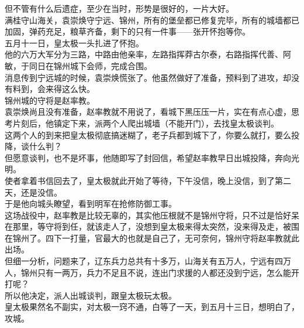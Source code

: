 \begin{multicols}{\theparacolNo}
但不管有什么后遗症，至少在当时，形势是很好的，一片大好。\\

满桂守山海关，袁崇焕守宁远、锦州，所有的堡垒都已修复完毕，所有的城墙都已加固，弹药充足，粮草齐备，剩下的只有一件事——张开怀抱等你。\\

五月十一日，皇太极一头扎进了怀抱。\\

他的六万大军分为三路，中路由他亲率，左路指挥莽古尔泰，右路指挥代善、阿敏，于同日在锦州城下会师，完成合围。\\

消息传到宁远城的时候，袁崇焕慌张了。他虽然做好了准备，预料到了进攻，却没有料到，会来得这么快。\\

锦州城的守将是赵率教。\\

袁崇焕尚且没有准备，赵率教就不用说了，看城下黑压压一片，实在有点心虚，思考片刻后，他镇定下来，派两个人爬出城墙（不能开门），去找皇太极谈判。\\

这两个人的到来把皇太极彻底搞迷糊了，老子兵都到城下了，你要么就打，要么投降，谈什么判？\\

但愿意谈判，也不是坏事，他随即写了封回信，希望赵率教早日出城投降，奔向光明。\\

使者拿着书信回去了，皇太极就此开始了等待，下午没信，晚上没信，到了第二天，还是没信。\\

于是他向城头瞭望，看到明军在抢修防御工事。\\

这场战役中，赵率教是比较无辜的，其实他压根就不是锦州守将，只不过是恰好呆在那里，等守将到任，就该走人了，没想到皇太极来得太突然，没来得及走，被围在锦州了。四下一打量，官最大的也就是自己了，无可奈何，锦州守将赵率教就此出场。\\

但细一分析，问题来了，辽东兵力总共有十多万，山海关有五万人，宁远有四万人，锦州只有一两万，兵力不足且不说，连出门求援的人都还没到宁远，怎么能开打呢？\\

所以他决定，派人出城谈判，跟皇太极玩太极。\\

皇太极果然名不副实，对太极一窍不通，白等了一天，到五月十三日，想明白了，攻城。\\


\end{multicols}
